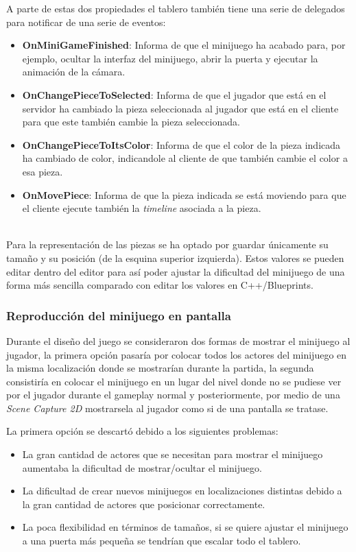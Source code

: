 A parte de estas dos propiedades el tablero también tiene una serie de delegados para notificar de una serie de eventos: \\

\begin{itemize}
	\item \textbf{OnMiniGameFinished}: Informa de que el minijuego ha acabado para, por ejemplo, ocultar la interfaz del minijuego, abrir la puerta y ejecutar la animación de la cámara.
	\item \textbf{OnChangePieceToSelected}: Informa de que el jugador que está en el servidor ha cambiado la pieza seleccionada al jugador que está en el cliente para que este también cambie la pieza seleccionada.
	\item \textbf{OnChangePieceToItsColor}: Informa de que el color de la pieza indicada ha cambiado de color, indicandole al cliente de que también cambie el color a esa pieza.
	\item \textbf{OnMovePiece}: Informa de que la pieza indicada se está moviendo para que el cliente ejecute también la \textit{timeline} asociada a la pieza.
\end{itemize} \\

Para la representación de las piezas se ha optado por guardar únicamente su tamaño y su posición (de la esquina superior izquierda). Estos valores se pueden editar dentro del editor para así poder ajustar la dificultad del minijuego de una forma más sencilla comparado con editar los valores en C++/Blueprints.\\


\subsubsection{Reproducción del minijuego en pantalla}

Durante el diseño del juego se consideraron dos formas de mostrar el minijuego al jugador, la primera opción pasaría por colocar todos los actores del minijuego en la misma localización donde se mostrarían durante la partida, la segunda consistiría en colocar el minijuego en un lugar del nivel donde no se pudiese ver por el jugador durante el gameplay normal y posteriormente, por medio de una \textit{Scene Capture 2D} mostrarsela al jugador como si de una pantalla se tratase.

La primera opción se descartó debido a los siguientes problemas:

\begin{itemize}
	\item La gran cantidad de actores que se necesitan para mostrar el minijuego aumentaba la dificultad de mostrar/ocultar el minijuego.
	\item La dificultad de crear nuevos minijuegos en localizaciones distintas debido a la gran cantidad de actores que posicionar correctamente.
	\item La poca flexibilidad en términos de tamaños, si se quiere ajustar el minijuego a una puerta más pequeña se tendrían que escalar todo el tablero.
\end{itemize}

